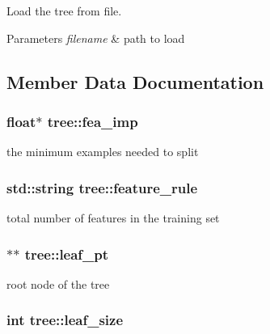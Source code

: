 Load the tree from file. 


\begin{DoxyParams}{Parameters}
{\em filename} & path to load \\
\hline
\end{DoxyParams}


\subsection{Member Data Documentation}
\hypertarget{classtree_ad335e57b2f4f2326825694311bcc69e7}{
\subsubsection[{fea\+\_\+imp}]{\setlength{\rightskip}{0pt plus 5cm}float$\ast$ tree\+::fea\+\_\+imp\hspace{0.3cm}{\ttfamily [protected]}}}\label{classtree_ad335e57b2f4f2326825694311bcc69e7}
the minimum examples needed to split \hypertarget{classtree_a5aba3b77a347165517a20d5fab94382d}{
\subsubsection[{feature\+\_\+rule}]{\setlength{\rightskip}{0pt plus 5cm}std\+::string tree\+::feature\+\_\+rule\hspace{0.3cm}{\ttfamily [protected]}}}\label{classtree_a5aba3b77a347165517a20d5fab94382d}
total number of features in the training set \hypertarget{classtree_ac697cf1868c26ac26f005e6ee8be9d43}{
\subsubsection[{leaf\+\_\+pt}]{$\ast$$\ast$ tree\+::leaf\+\_\+pt\hspace{0.3cm}{\ttfamily [protected]}}}\label{classtree_ac697cf1868c26ac26f005e6ee8be9d43}
root node of the tree \hypertarget{classtree_a551919e1402a700821694297623017fc}{
\subsubsection[{leaf\+\_\+size}]{\setlength{\rightskip}{0pt plus 5cm}int tree\+::leaf\+\_\+size\hspace{0.3cm}{\ttfamily [protected]}}}\label{classtree_a551919e1402a700821694297623017fc}
